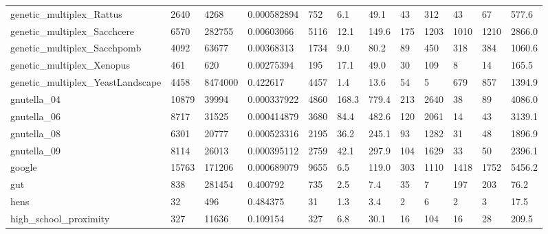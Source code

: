 \begin{longtable}{llllllllllll}
 genetic\_multiplex\_Rattus                           & 2640       & 4268      & 0.000582894 & 752   & 6.1    & 49.1   & 43    & 312    & 43     & 67     & 577.6   \\
 genetic\_multiplex\_Sacchcere                        & 6570       & 282755    & 0.00603066  & 5116  & 12.1   & 149.6  & 175   & 1203   & 1010   & 1210   & 2866.0  \\
 genetic\_multiplex\_Sacchpomb                        & 4092       & 63677     & 0.00368313  & 1734  & 9.0    & 80.2   & 89    & 450    & 318    & 384    & 1060.6  \\
 genetic\_multiplex\_Xenopus                          & 461        & 620       & 0.00275394  & 195   & 17.1   & 49.0   & 30    & 109    & 8      & 14     & 165.5   \\
 genetic\_multiplex\_YeastLandscape                   & 4458       & 8474000   & 0.422617    & 4457  & 1.4    & 13.6   & 54    & 5      & 679    & 857    & 1394.9  \\
 gnutella\_04                                        & 10879      & 39994     & 0.000337922 & 4860  & 168.3  & 779.4  & 213   & 2640   & 38     & 89     & 4086.0  \\
 gnutella\_06                                        & 8717       & 31525     & 0.000414879 & 3680  & 84.4   & 482.6  & 120   & 2061   & 14     & 43     & 3139.1  \\
 gnutella\_08                                        & 6301       & 20777     & 0.000523316 & 2195  & 36.2   & 245.1  & 93    & 1282   & 31     & 48     & 1896.9  \\
 gnutella\_09                                        & 8114       & 26013     & 0.000395112 & 2759  & 42.1   & 297.9  & 104   & 1629   & 33     & 50     & 2396.1  \\
 google                                             & 15763      & 171206    & 0.000689079 & 9655  & 6.5    & 119.0  & 303   & 1110   & 1418   & 1752   & 5456.2  \\
 gut                                                & 838        & 281454    & 0.400792    & 735   & 2.5    & 7.4    & 35    & 7      & 197    & 203    & 76.2    \\
 hens                                               & 32         & 496       & 0.484375    & 31    & 1.3    & 3.4    & 2     & 6      & 2      & 3      & 17.5    \\
 high\_school\_proximity                              & 327        & 11636     & 0.109154    & 327   & 6.8    & 30.1   & 16    & 104    & 16     & 28     & 209.5   \\

\end{longtable}
